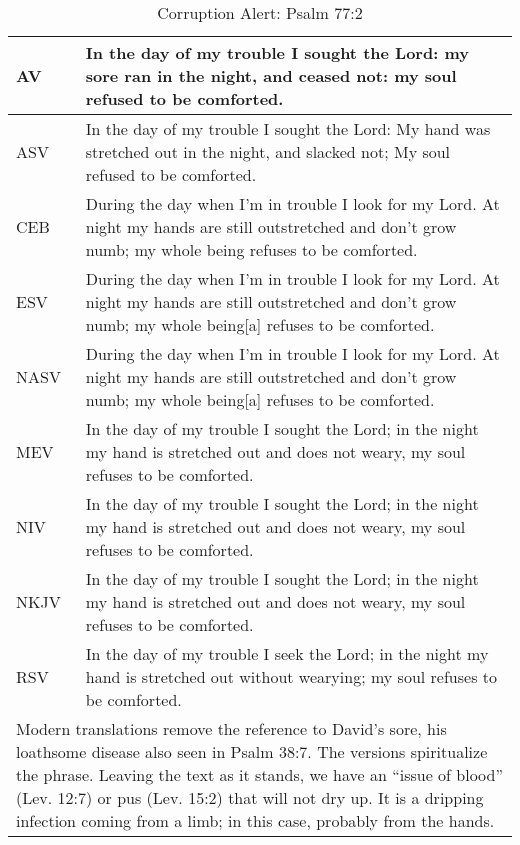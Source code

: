 \begin{center}

\begin{table}[ht]
\centering
\begin{tabular}{|p{.5in}|p{3.5in}|}
\hline

\textcolor[rgb]{0.00,0.00,1.00}{AV} & \textcolor[rgb]{0.00,0.00,1.00}{In the day of my trouble I sought the Lord: my sore ran in the night, and ceased not: my soul refused to be comforted.} \\ \hline 

\hline
\hline


ASV &  In the day of my trouble I sought the Lord: My hand was stretched out in the night, and slacked not; My soul refused to be comforted. \\ \hline
%
CEB &  During the day when I’m in trouble I look for my Lord.  At night my hands are still outstretched and don’t grow numb;  my whole being refuses to be comforted.\\ \hline
%
ESV & During the day when I’m in trouble I look for my Lord.  At night my hands are still outstretched and don’t grow numb;   my whole being[a] refuses to be comforted. \\ \hline
%
NASV & During the day when I’m in trouble I look for my Lord.  At night my hands are still outstretched and don’t grow numb;  my whole being[a] refuses to be comforted. \\ \hline
%
MEV & In the day of my trouble I sought the Lord;   in the night my hand is stretched out and does not weary,   my soul refuses to be comforted. \\ \hline
%
NIV &  In the day of my trouble I sought the Lord;  in the night my hand is stretched out and does not weary,   my soul refuses to be comforted. \\ \hline
%
NKJV &  In the day of my trouble I sought the Lord; in the night my hand is stretched out and does not weary,   my soul refuses to be comforted.\\ \hline
%
RSV &  In the day of my trouble I seek the Lord;  in the night my hand is stretched out without wearying;  my soul refuses to be comforted. \\ \hline

\hline
\hline

\multicolumn{2}{|p{4.3in}|}{{\textcolor{jungle}{Modern translations remove the reference to David's sore, his loathsome disease also seen in Psalm 38:7.  The versions spiritualize the phrase.  Leaving the text as it stands, we have an “issue of blood” (Lev. 12:7) or pus (Lev. 15:2) that will not dry up. It is a dripping infection coming from a limb; in this case, probably from the hands. \cite{Ruckman1992PsalmsV2}}}} \\ \hline

\end{tabular}
\caption[Corruption Alert: Psalm 77:2]{Corruption Alert: Psalm 77:2} \label{table:Corruption Psalm 77:2}

\end{table}

\end{center}


